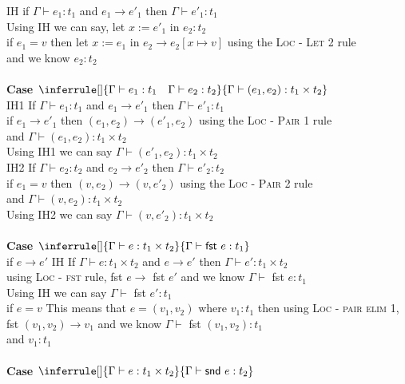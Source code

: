 \documentclass{article}
\begin{document}
IH if $\Gamma \vdash e_1 : t_1$ and  $e_1 \to e'_1$ then $\Gamma \vdash e'_1 : t_1$ \\
Using IH we can say, let $ x := e'_1$ in $ e_2 : t_2$\\
if $e_1 = v$ then let $ x := e_1$ in $ e_2 \to e_2[x \mapsto v]$ using the \textsc{Loc - Let 2} rule\\
and we know $e_2 : t_2$
\\\\
\textbf{Case $\inferrule []
{ \Gamma \vdash e_1 : t_1 \quad \Gamma \vdash e_2 : t_2}
{ \Gamma \vdash (e_1, e_2) : t_1 \times t_2 }$ } \\
IH1 If $\Gamma \vdash e_1 : t_1$ and  $e_1 \to e'_1$ then $\Gamma \vdash e'_1 : t_1$ \\
if $e_1 \to e'_1$ then $(e_1,e_2) \to (e'_1, e_2)$ using the \textsc{Loc - Pair 1} rule\\
and $\Gamma \vdash (e_1, e_2) : t_1 \times t_2$ \\
Using IH1 we can say $\Gamma \vdash (e'_1, e_2) : t_1 \times t_2$ \\
IH2 If $\Gamma \vdash e_2 : t_2$ and  $e_2 \to e'_2$ then $\Gamma \vdash e'_2 : t_2$ \\
if $e_1 = v$ then $(v,e_2) \to (v, e'_2)$ using the \textsc{Loc - Pair 2} rule\\
and $\Gamma \vdash (v, e_2) : t_1 \times t_2$ \\
Using IH2 we can say $\Gamma \vdash (v, e'_2) : t_1 \times t_2$
\\\\
\textbf{Case $\inferrule []
{ \Gamma \vdash e : t_1 \times t_2 }
{ \Gamma \vdash \textsf{fst} \  e : t_1 }$ } \\
if $e \to e'$
IH If $\Gamma \vdash e : t_1 \times t_2$ and  $e \to e'$ then $\Gamma \vdash e' : t_1 \times t_2$ \\
using \textsc{Loc - fst} rule, fst $e \to$ fst $e'$ and we know $\Gamma \vdash$ fst $e : t_1$ \\
Using IH we can say $\Gamma \vdash$ fst $ e' : t_1$ \\
if $e = v$ This means that $e = (v_1, v_2)$ where $v_1 : t_1$
then using \textsc{Loc - pair elim 1}, fst $(v_1, v_2) \to v_1$ and we know $\Gamma \vdash$ fst $(v_1, v_2) : t_1$ \\
and $v_1: t_1$\\\\
\textbf{Case $\inferrule []
{ \Gamma \vdash e : t_1 \times t_2 }
{ \Gamma \vdash \textsf{snd} \  e : t_2 }$ } \\
\end{document}
